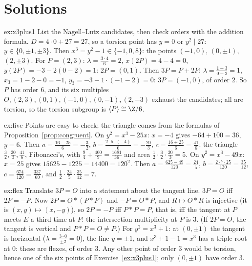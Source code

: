 \section{Solutions}

\begin{solution}{ex:x3plus1}
\idea List the Nagell--Lutz candidates, then check orders with the addition formula.
\writeup $D=4\cdot0+27=27$, so a torsion point has $y=0$ or $y^2\mid27$: $y\in\{0,\pm1,\pm3\}$. Then $x^3=y^2-1\in\{-1,0,8\}$: the points $(-1,0)$, $(0,\pm1)$, $(2,\pm3)$.
For $P=(2,3)$: $\lambda=\frac{3\cdot4}{6}=2$, $x(2P)=4-4=0$, $y(2P)=-3-2(0-2)=1$: $2P=(0,1)$. Then $3P=P+2P$: $\lambda=\frac{1-3}{0-2}=1$, $x_3=1-2-0=-1$, $y_3=-3-1\cdot(-1-2)=0$:
$3P=(-1,0)$, of order $2$. So $P$ has order $6$, and its six multiples $O,(2,3),(0,1),(-1,0),(0,-1),(2,-3)$ exhaust the candidates; all are torsion, so the torsion
subgroup is $\langle P\rangle\cong\Z/6$.
\end{solution}

\begin{solution}{ex:five}
\idea Points are easy to check; the triangle comes from the formulas of Proposition~\ref{prop:congruent}.
\writeup On $y^2=x^3-25x$: $x=-4$ gives $-64+100=36$, $y=6$. Then $a=\frac{16-25}6=-\frac32$, $b=\frac{2\cdot5\cdot(-4)}6=-\frac{20}3$, $c=\frac{16+25}6=\frac{41}6$: the
triangle $\frac32,\frac{20}3,\frac{41}6$, Fibonacci's, with $\frac94+\frac{400}9=\frac{1681}{36}$ and area $\frac12\cdot\frac32\cdot\frac{20}3=5$. On $y^2=x^3-49x$: $x=25$ gives
$15625-1225=14400=120^2$. Then $a=\frac{625-49}{120}=\frac{24}5$, $b=\frac{2\cdot7\cdot25}{120}=\frac{35}{12}$, $c=\frac{674}{120}=\frac{337}{60}$, and $\frac12\cdot\frac{24}5\cdot\frac{35}{12}=7$.
\end{solution}

\begin{solution}{ex:flex}
\idea Translate $3P=O$ into a statement about the tangent line.
\writeup $3P=O$ iff $2P=-P$. Now $2P=O*(P*P)$ and $-P=O*P$, and $R\mapsto O*R$ is injective (it is $(x,y)\mapsto(x,-y)$), so $2P=-P$ iff $P*P=P$, that is, iff the
tangent at $P$ meets $E$ a third time at $P$: the intersection multiplicity at $P$ is $3$. (If $2P=O$, the tangent is vertical and $P*P=O\ne P$.) For $y^2=x^3+1$:
at $(0,\pm1)$ the tangent is horizontal ($\lambda=\frac{3\cdot0}{\pm2}=0$), the line $y=\pm1$, and $x^3+1-1=x^3$ has a triple root at $0$: these are flexes, of order $3$.
Any other point of order $3$ would be torsion, hence one of the six points of Exercise~\ref{ex:x3plus1}; only $(0,\pm1)$ have order $3$.
\end{solution}

